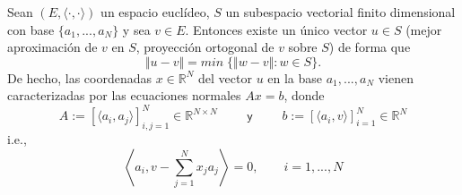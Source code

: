 \begin{nth}
Sean $(E, \langle \cdot , \cdot \rangle )$ un espacio euclídeo, $S$ un subespacio vectorial finito dimensional con base $\lbrace a_1,...,a_N \rbrace$ y sea $v \in E$. Entonces existe un único vector $u \in S$ (mejor aproximación de $v$ en $S$, proyección ortogonal de $v$ sobre $S$) de forma que
\[ \Vert u - v \Vert = min \; \lbrace \Vert w-v \Vert : w \in S \rbrace . \]
De hecho, las coordenadas $x \in \mathbb{R}^N$ del vector $u$ en la base {$a_1,...,a_N$} vienen caracterizadas por las ecuaciones normales $Ax = b$, donde
\[ A := \left[ \langle a_i, a_j \rangle \right] _{i,j=1}^N \in \mathbb{R}^{N \times N} \qquad \textsf{ y } \qquad b := \left[ \langle a_i, v \rangle \right] _{i=1}^N \in \mathbb{R}^N \]
i.e.,
\[ \left\langle a_i, v - \sum_{j=1}^N x_ja_j \right\rangle = 0, \qquad i=1,...,N \]
\end{nth}
